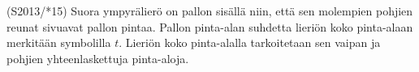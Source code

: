 \begin{tehtava} 
(S2013/*15) Suora ympyrälierö on pallon sisällä niin, että sen molempien pohjien reunat sivuavat pallon pintaa. Pallon pinta-alan suhdetta lieriön koko pinta-alaan merkitään symbolilla $t$. Lieriön koko pinta-alalla tarkoitetaan sen vaipan ja pohjien yhteenlaskettuja pinta-aloja.
  \begin{alakohdat}
  \end{alakohdat}
				\begin{vastaus}
				\begin{alakohdat}
				\end{alakohdat}
				\end{vastaus}
\end{tehtava}